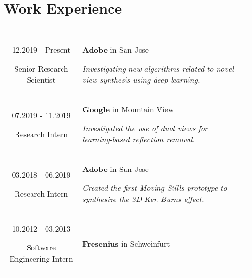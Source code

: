 \documentclass[10pt]{article}
\begin{document}
\section*{Work Experience}
\vspace{-0.3cm}
{\color{E6E6E6} \hrule height 0.04cm}
\vspace{0.4cm}
\renewcommand{\arraystretch}{1.0}
\begin{tabular}{C Z D}
	{
		12.2019 - Present
		
		\vspace{-0.05cm}
		
		{\scriptsize Senior Research Scientist}
	}
	&
	{	
		{\bf Adobe} {\scriptsize in San Jose}
		
		\vspace{0.05cm}
		
		{\scriptsize \it Investigating new algorithms related to novel view synthesis using deep learning.}
		
		\vspace{0.0cm}
	}
	\\
	{
		07.2019 - 11.2019
		
		\vspace{-0.05cm}
		
		{\scriptsize Research Intern}
	}
	&
	{	
		{\bf Google} {\scriptsize in Mountain View}
		
		\vspace{0.05cm}
		
		{\scriptsize \it Investigated the use of dual views for learning-based reflection removal.}
		
		\vspace{0.0cm}
	}
	\\
	{
		03.2018 - 06.2019
		
		\vspace{-0.05cm}
		
		{\scriptsize Research Intern}
	}
	&
	{	
		{\bf Adobe} {\scriptsize in San Jose}
		
		\vspace{0.05cm}
		
		{\scriptsize \it Created the first Moving Stills prototype to synthesize the 3D Ken Burns effect.}
		
		\vspace{0.0cm}
	}
	\\
	{
		10.2012 - 03.2013
		
		\vspace{-0.05cm}
		
		{\scriptsize \parbox{4.0cm}{Software Engineering Intern}}
	}
	&
	{	
		{\bf Fresenius} {\scriptsize in Schweinfurt}
		
}
\end{tabular}
\end{document}
